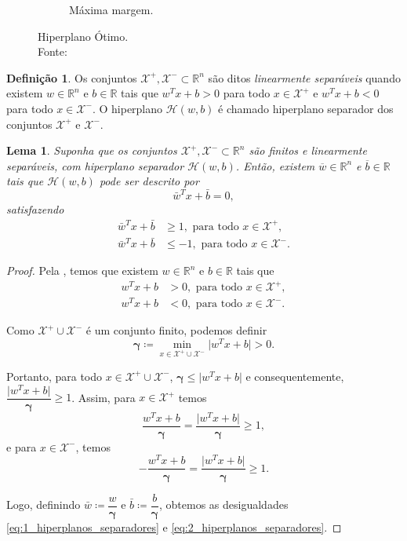 \documentclass[12pt,a4paper]{scrartcl}
\def\Xset{\mathcal{X}}
\def\Hset{\mathcal{H}}
\def\RR{\mathds{R}}
\def\wbar{\bar{w}}
\def\bbar{\bar{b}}
\newtheorem{lema}{Lema}
\theoremstyle{definition}%
\newtheorem{defi}{Definição}
\begin{document}
\begin{figure}[hbtp]
\begin{subfigure}[h]{0.38\textwidth}
		\caption{Máxima margem. \label{fig3:b}}	
	\end{subfigure}
\caption{Hiperplano Ótimo. \label{fig3}
\\ Fonte: \textcite{Evelin2017}}
\end{figure}


\begin{defi} \label{def1} Os conjuntos $\Xset^{+}, \Xset^{-} \subset \RR^n$ são ditos \emph{linearmente separáveis} quando existem $w\in \RR^n$ e $b\in \RR$  tais que $w^{T}x+b>0$ para todo $x\in \Xset^{+}$ e $w^{T}x+b<0$ para todo $x\in \Xset^{-}$. O hiperplano $\Hset(w,b)$ é chamado hiperplano separador dos conjuntos $\Xset^{+}$ e $\Xset^{-}$.
\end{defi}


\begin{lema} \label{lema:hiperplanos_separadores} 
Suponha que os conjuntos $\Xset^{+}, \Xset^{-} \subset \RR^n$ são finitos e linearmente separáveis, com hiperplano separador $\Hset(w,b)$. Então, existem $\overline{w}\in \RR^n$ e $\overline{b}\in \RR$ tais que $\Hset(w,b)$ pode ser descrito por
\[
\wbar^{T}x+\bbar =0,
\]
satisfazendo
\begin{align}
\wbar^{T}x+\bbar &\geq 1, \text{ para todo } x\in \Xset^{+}, \label{eq:1_hiperplanos_separadores} \\
\wbar^{T}x+\bbar &\leq -1, \text{ para todo } x\in \Xset^{-}. \label{eq:2_hiperplanos_separadores}
\end{align}
\end{lema} 

\begin{proof}
Pela  , temos que existem $w\in \RR^n$ e $b\in \RR$ tais que
\begin{align}
w^{T}x+b &>0, \text{ para todo } x\in \Xset^{+}, \\
w^{T}x+b &<0, \text{ para todo } x\in \Xset^{-}.
\end{align}  

Como $\Xset^{+}\cup \Xset^{-}$ é um conjunto finito, podemos definir
\[ \boldsymbol{\gamma} \coloneqq \min_{x\in \Xset^{+}\cup \Xset^{-}} \vert w^{T}x+b\vert  >0. \]

Portanto, para todo $x\in \Xset^{+}\cup \Xset^{-}$, $\boldsymbol{\gamma} \leq \vert w^{T}x+b\vert$ e consequentemente, $\dfrac{\vert w^{T}x+b\vert }{\boldsymbol{\gamma}} \geq 1$. Assim, para $x\in \Xset^{+}$ temos
\[ \dfrac{w^{T}x+b}{\boldsymbol{\gamma}} = \dfrac{\vert w^{T}x+b\vert }{\boldsymbol{\gamma}} \geq 1, \]
e para $x\in \Xset^{-}$, temos
\[- \dfrac{w^{T}x+b}{\boldsymbol{\gamma}} = \dfrac{\vert w^{T}x+b\vert }{\boldsymbol{\gamma}} \geq 1. \]

Logo, definindo $\wbar \coloneqq \dfrac{w}{\boldsymbol{\gamma}}$ e $\bbar \coloneqq \dfrac{b}{\boldsymbol{\gamma}}$, obtemos as desigualdades \eqref{eq:1_hiperplanos_separadores} e \eqref{eq:2_hiperplanos_separadores}. 

\end{proof}
\end{document}
